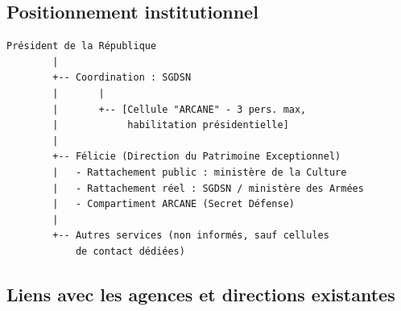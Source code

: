 \documentclass[10pt,a5paper,twoside]{book}
\begin{document}
\subsection{Positionnement institutionnel}

\begin{shaded}
\begin{verbatim}
Président de la République
        |
        +-- Coordination : SGDSN
        |       |
        |       +-- [Cellule "ARCANE" - 3 pers. max,
        |            habilitation présidentielle]
        |
        +-- Félicie (Direction du Patrimoine Exceptionnel)
        |   - Rattachement public : ministère de la Culture
        |   - Rattachement réel : SGDSN / ministère des Armées
        |   - Compartiment ARCANE (Secret Défense)
        |
        +-- Autres services (non informés, sauf cellules
            de contact dédiées)
\end{verbatim}
\end{shaded}

\newpage

\subsection{Liens avec les agences et directions existantes}
\end{document}
